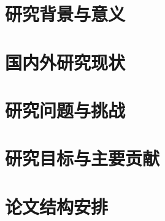 
\section{研究背景与意义}


\section{国内外研究现状}


\section{研究问题与挑战}


\section{研究目标与主要贡献}


\section{论文结构安排}
